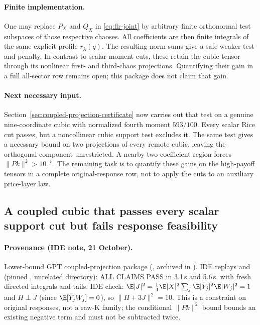 \paragraph{Finite implementation.}
One may replace $P_X$ and $Q_X$ in \eqref{eq:flr-joint} by arbitrary
finite orthonormal test subspaces of those respective chaoses.
All coefficients are then finite integrals of the same explicit
profile $r_\lambda(q)$. The resulting norm sums give a safe weaker
test and penalty. In contrast to scalar moment cuts, these retain
the cubic tensor through its nonlinear first- and third-chaos
projections. Quantifying their gain in a full all-sector row remains
open; this package does not claim that gain.

\paragraph{Next necessary input.} Section~\ref{sec:coupled-projection-certificate} now carries out that test on a genuine nine-coordinate cubic with normalized
fourth moment $593/100$. Every scalar Rice cut passes, but a noncollinear cubic support test excludes it. The same test gives a necessary bound on two projections of
every remote cubic, leaving the orthogonal component unrestricted. A nearby two-coefficient region forces $\|Pk\|^2>10^{-5}$. The remaining task is to quantify these
gains on the high-payoff tensors in a complete original-response row, not to apply the cuts to an auxiliary price-layer law.

\subsection{A coupled cubic that passes every scalar support cut but fails response feasibility}
\paragraph{Provenance (IDE note, 21 October).} Lower-bound GPT coupled-projection package (, archived in
). IDE replays  and  (pinned , unrelated directory):
ALL CLAIMS PASS in 3.1\,s and 5.6\,s, with fresh directed integrals and tails. IDE check: $\E|J|^2=\frac14\E|X|^2\sum_j\E|Y_j|^2\E|W_j|^2=1$ and $H\perp J$ (since
$\E[\bar Y_jW_j]=0$), so $\|H+3J\|^2=10$. This is a constraint on original responses, not a raw-K family; the conditional $\|Pk\|^2$ bound bounds an existing negative
term and must not be subtracted twice.


